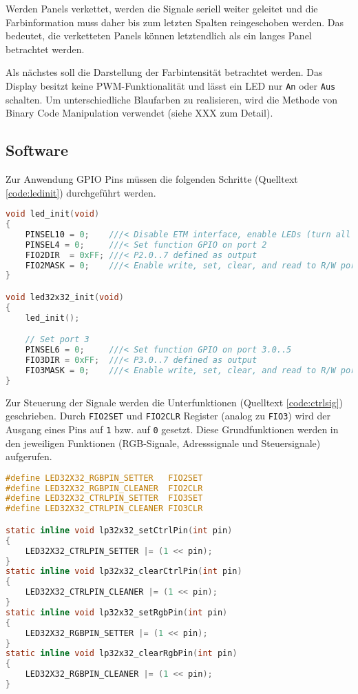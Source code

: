 Werden Panels verkettet, werden die Signale seriell weiter geleitet und die Farbinformation muss daher bis zum letzten Spalten reingeschoben werden. Das bedeutet, die verketteten Panels können letztendlich als ein langes Panel betrachtet werden.

Als nächstes soll die Darstellung der Farbintensität betrachtet werden. Das Display besitzt keine PWM-Funktionalität und lässt ein LED nur \texttt{An} oder \texttt{Aus} schalten. Um unterschiedliche Blaufarben zu realisieren, wird die Methode von Binary Code Manipulation verwendet (siehe XXX zum Detail). 

\subsection{Software}
 Zur Anwendung GPIO Pins müssen die folgenden Schritte (Quelltext \ref{code:ledinit}) durchgeführt werden.
\begin{lstlisting}[language={c}, caption={Initialisierung von GPIO als Output}, label={code:ledinit}]
void led_init(void)
{
    PINSEL10 = 0;    ///< Disable ETM interface, enable LEDs (turn all LEDs on)
    PINSEL4 = 0;     ///< Set function GPIO on port 2
    FIO2DIR  = 0xFF; ///< P2.0..7 defined as output
    FIO2MASK = 0;    ///< Enable write, set, clear, and read to R/W port 2
}

void led32x32_init(void)
{
    led_init();

    // Set port 3
    PINSEL6 = 0;     ///< Set function GPIO on port 3.0..5
    FIO3DIR = 0xFF;  ///< P3.0..7 defined as output
    FIO3MASK = 0;    ///< Enable write, set, clear, and read to R/W port 3
}
\end{lstlisting}

Zur Steuerung der Signale werden die Unterfunktionen (Quelltext \ref{code:ctrlsig}) geschrieben. Durch \texttt{FIO2SET} und \texttt{FIO2CLR} Register (analog zu \texttt{FIO3}) wird der Ausgang eines Pins auf \texttt{1} bzw. auf \texttt{0} gesetzt. Diese Grundfunktionen werden in den jeweiligen Funktionen (RGB-Signale, Adresssignale und Steuersignale) aufgerufen.

\begin{lstlisting}[language={c}, caption={Funktionen zur Steuerung der Signale.}, label={code:ctrlsig}]
#define LED32X32_RGBPIN_SETTER   FIO2SET
#define LED32X32_RGBPIN_CLEANER  FIO2CLR
#define LED32X32_CTRLPIN_SETTER  FIO3SET
#define LED32X32_CTRLPIN_CLEANER FIO3CLR

static inline void lp32x32_setCtrlPin(int pin)
{
    LED32X32_CTRLPIN_SETTER |= (1 << pin);
}
static inline void lp32x32_clearCtrlPin(int pin)
{
    LED32X32_CTRLPIN_CLEANER |= (1 << pin);
}
static inline void lp32x32_setRgbPin(int pin)
{
    LED32X32_RGBPIN_SETTER |= (1 << pin);
}
static inline void lp32x32_clearRgbPin(int pin)
{
    LED32X32_RGBPIN_CLEANER |= (1 << pin);
}
\end{lstlisting}

